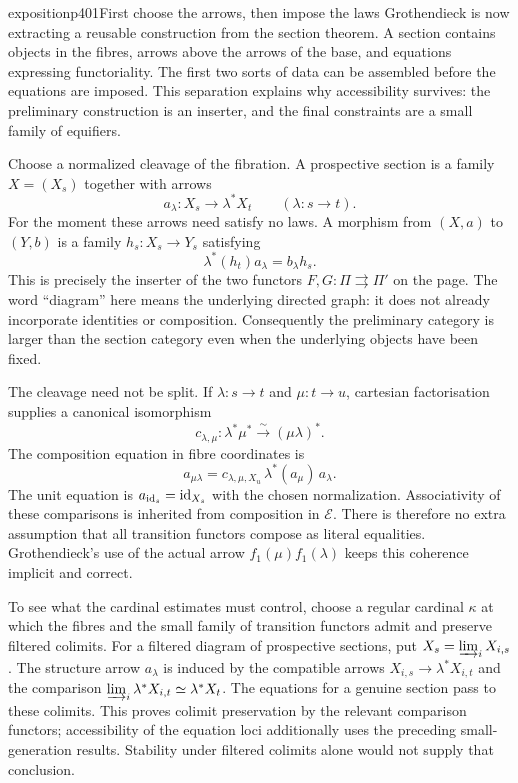 \begin{dcomment}{exposition}{p401}{First choose the arrows, then impose the laws}
Grothendieck is now extracting a reusable construction from the section theorem. A section contains objects in the fibres, arrows above the arrows of the base, and equations expressing functoriality. The first two sorts of data can be assembled before the equations are imposed. This separation explains why accessibility survives: the preliminary construction is an inserter, and the final constraints are a small family of equifiers.

Choose a normalized cleavage of the fibration. A prospective section is a family $X=(X_s)$ together with arrows
\[
 a_\lambda:X_s\longrightarrow\lambda^*X_t
 \qquad(\lambda:s\longrightarrow t).
\]
For the moment these arrows need satisfy no laws. A morphism from $(X,a)$ to $(Y,b)$ is a family $h_s:X_s\to Y_s$ satisfying
\[
 \lambda^*(h_t)a_\lambda=b_\lambda h_s.
\]
This is precisely the inserter of the two functors $F,G:\Pi\rightrightarrows\Pi'$ on the page. The word ``diagram'' here means the underlying directed graph: it does not already incorporate identities or composition. Consequently the preliminary category is larger than the section category even when the underlying objects have been fixed.

The cleavage need not be split. If $\lambda:s\to t$ and $\mu:t\to u$, cartesian factorisation supplies a canonical isomorphism
\[
 c_{\lambda,\mu}:\lambda^*\mu^*\xrightarrow{\sim}(\mu\lambda)^*.
\]
The composition equation in fibre coordinates is
\[
 a_{\mu\lambda}
 =c_{\lambda,\mu,X_u}\,\lambda^*(a_\mu)\,a_\lambda.
\]
The unit equation is $a_{\mathrm{id}_s}=\mathrm{id}_{X_s}$ with the chosen normalization. Associativity of these comparisons is inherited from composition in $\mathcal E$. There is therefore no extra assumption that all transition functors compose as literal equalities. Grothendieck's use of the actual arrow $f_1(\mu)f_1(\lambda)$ keeps this coherence implicit and correct.

To see what the cardinal estimates must control, choose a regular cardinal $\kappa$ at which the fibres and the small family of transition functors admit and preserve filtered colimits. For a filtered diagram of prospective sections, put $X_s=\varinjlim_iX_{i,s}$. The structure arrow $a_\lambda$ is induced by the compatible arrows $X_{i,s}\to\lambda^*X_{i,t}$ and the comparison $\varinjlim_i\lambda^*X_{i,t}\simeq\lambda^*X_t$. The equations for a genuine section pass to these colimits. This proves colimit preservation by the relevant comparison functors; accessibility of the equation loci additionally uses the preceding small-generation results. Stability under filtered colimits alone would not supply that conclusion.


\end{dcomment}
